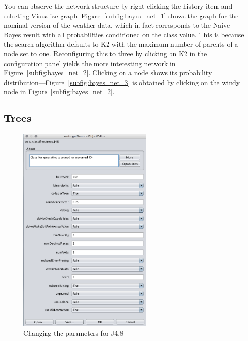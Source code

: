 You can observe the network structure by right-clicking the history
item and selecting Visualize graph. Figure~\ref{subfig:bayes_net_1}
shows the graph for the nominal version of the weather data, which in
fact corresponds to the Naive Bayes result with all probabilities
conditioned on the class value. This is because the search algorithm
defaults to K2 with the maximum number of parents of a node set to
one. Reconfiguring this to three by clicking on K2 in the
configuration panel yields the more interesting network in
Figure~\ref{subfig:bayes_net_2}. Clicking on a node shows its
probability distribution---Figure~\ref{subfig:bayes_net_3} is obtained
by clicking on the windy node in Figure~\ref{subfig:bayes_net_2}.

\subsection{Trees}

\begin{figure}[!th]
\centering
\includegraphics[width=0.6\textwidth]{images/B2_20.png}
\caption{Changing the parameters for J4.8.}
\label{fig:goe_j48}
\end{figure}

